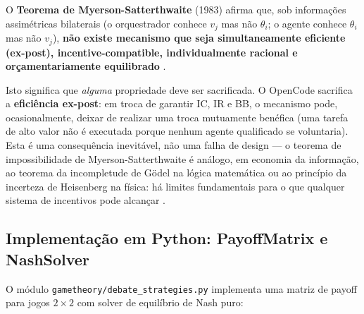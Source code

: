 O \textbf{Teorema de Myerson-Satterthwaite} (1983) afirma que, sob informações assimétricas bilaterais (o orquestrador conhece $v_j$ mas não $\theta_i$; o agente conhece $\theta_i$ mas não $v_j$), \textbf{não existe mecanismo que seja simultaneamente eficiente (ex-post), incentive-compatible, individualmente racional e orçamentariamente equilibrado} \cite{myerson1983efficient}.

Isto significa que \textit{alguma} propriedade deve ser sacrificada. O OpenCode sacrifica a \textbf{eficiência ex-post}: em troca de garantir IC, IR e BB, o mecanismo pode, ocasionalmente, deixar de realizar uma troca mutuamente benéfica (uma tarefa de alto valor não é executada porque nenhum agente qualificado se voluntaria). Esta é uma consequência inevitável, não uma falha de design --- o teorema de impossibilidade de Myerson-Satterthwaite é análogo, em economia da informação, ao teorema da incompletude de Gödel na lógica matemática ou ao princípio da incerteza de Heisenberg na física: há limites fundamentais para o que qualquer sistema de incentivos pode alcançar \cite{myerson1983efficient}.

\subsection{Implementação em Python: PayoffMatrix e NashSolver}

O módulo \texttt{gametheory/debate\_strategies.py} implementa uma matriz de payoff para jogos $2 \times 2$ com solver de equilíbrio de Nash puro:


